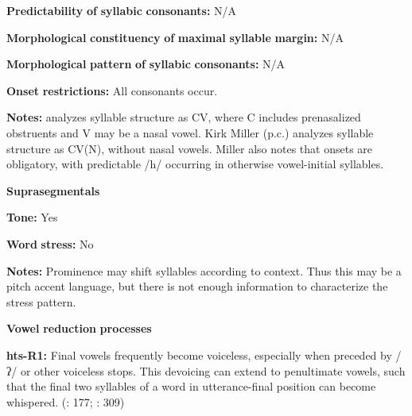 \documentclass[output=paper]{langsci/langscibook}
\begin{document}
\begin{styleBody}
\textbf{Predictability} \textbf{of} \textbf{syllabic} \textbf{consonants:} N/A
\end{styleBody}

\begin{styleBody}
\textbf{Morphological} \textbf{constituency} \textbf{of} \textbf{maximal} \textbf{syllable} \textbf{margin:} N/A
\end{styleBody}

\begin{styleBody}
\textbf{Morphological} \textbf{pattern} \textbf{of} \textbf{syllabic} \textbf{consonants:} N/A
\end{styleBody}

\begin{styleBody}
\textbf{Onset} \textbf{restrictions:} All consonants occur.
\end{styleBody}

\begin{styleBody}
\textbf{Notes:} \citet{Sands2013} analyzes syllable structure as CV, where C includes prenasalized obstruents and V may be a nasal vowel. Kirk Miller (p.c.) analyzes syllable structure as CV(N), without nasal vowels. Miller also notes that onsets are obligatory, with predictable /h/ occurring in otherwise vowel-initial syllables.
\end{styleBody}

\begin{styleBody}
\textbf{Suprasegmentals}
\end{styleBody}

\begin{styleBody}
\textbf{Tone:} Yes
\end{styleBody}

\begin{styleBody}
\textbf{Word} \textbf{stress:} No
\end{styleBody}

\begin{styleBody}
\textbf{Notes:} Prominence may shift syllables according to context. Thus this may be a pitch accent language, but there is not enough information to characterize the stress pattern.
\end{styleBody}

\begin{styleBody}
\textbf{Vowel} \textbf{reduction} \textbf{processes}
\end{styleBody}

\begin{styleBody}
\textbf{hts-R1:} Final vowels frequently become voiceless, especially when preceded by /ʔ/ or other voiceless stops. This devoicing can extend to penultimate vowels, such that the final two syllables of a word in utterance-final position can become whispered. (\citealt{SandsEtAl1996}: 177; \citealt{TuckerEtAl1977}: 309)
\end{styleBody}
\end{document}
